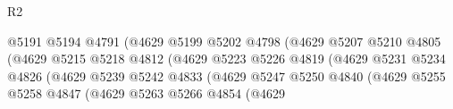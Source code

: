 \begin{lexlean}{R2}
\begin{coremodule}
                                                  @5191
                                                  @5194
                                                  @4791
                                                  (@4629
                                                    @5199
                                                    @5202
                                                    @4798
                                                    (@4629
                                                      @5207
                                                      @5210
                                                      @4805
                                                      (@4629
                                                        @5215
                                                        @5218
                                                        @4812
                                                        (@4629
                                                          @5223
                                                          @5226
                                                          @4819
                                                          (@4629
                                                            @5231
                                                            @5234
                                                            @4826
                                                            (@4629
                                                              @5239
                                                              @5242
                                                              @4833
                                                              (@4629
                                                                @5247
                                                                @5250
                                                                @4840
                                                                (@4629
                                                                  @5255
                                                                  @5258
                                                                  @4847
                                                                  (@4629
                                                                    @5263
                                                                    @5266
                                                                    @4854
                                                                    (@4629

\end{coremodule}
\end{lexlean}
